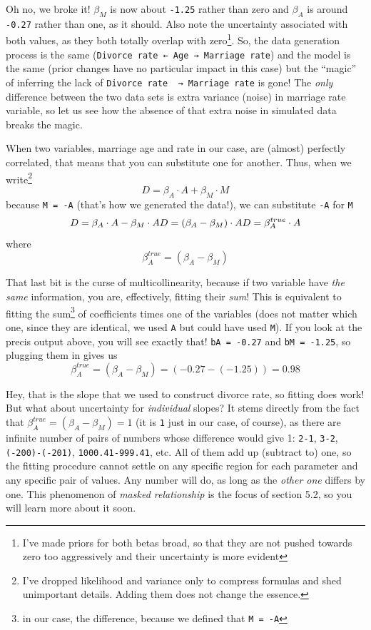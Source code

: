 \documentclass[
]{book}
\begin{document}
Oh no, we broke it! \(\beta_M\) is now about \texttt{-1.25} rather than zero and \(\beta_A\) is around \texttt{-0.27} rather than one, as it should. Also note the uncertainty associated with both values, as they both totally overlap with zero\footnote{I've made priors for both betas broad, so that they are not pushed towards zero too aggressively and their uncertainty is more evident}. So, the data generation process is the same (\texttt{Divorce\ rate\ ←\ Age\ →\ Marriage\ rate}) and the model is the same (prior changes have no particular impact in this case) but the ``magic'' of inferring the lack of \texttt{Divorce\ rate\ \ →\ Marriage\ rate} is gone! The \emph{only} difference between the two data sets is extra variance (noise) in marriage rate variable, so let us see how the absence of that extra noise in simulated data breaks the magic.

When two variables, marriage age and rate in our case, are (almost) perfectly correlated, that means that you can substitute one for another. Thus, when we write\footnote{I've dropped likelihood and variance only to compress formulas and shed unimportant details. Adding them does not change the essence.}
\[D = \beta_A \cdot A + \beta_M \cdot M\]
because \texttt{M\ =\ -A} (that's how we generated the data!), we can substitute \texttt{-A} for \texttt{M}
\[D = \beta_A \cdot A - \beta_M \cdot A \\
D = (\beta_A - \beta_M) \cdot A
D = \beta_A^{true} \cdot A
\]
where
\[ \beta_A^{true} = (\beta_A - \beta_M)
\]

That last bit is the curse of multicollinearity, because if two variable have \emph{the same} information, you are, effectively, fitting their \emph{sum}! This is equivalent to fitting the sum\footnote{in our case, the difference, because we defined that \texttt{M\ =\ -A}} of coefficients times one of the variables (does not matter which one, since they are identical, we used \texttt{A} but could have used \texttt{M}). If you look at the precis output above, you will see exactly that! \texttt{bA\ =\ -0.27} and \texttt{bM\ =\ -1.25}, so plugging them in gives us
\[ \beta_A^{true} = (\beta_A - \beta_M) = (-0.27 - (-1.25)) = 0.98\]

Hey, that is the slope that we used to construct divorce rate, so fitting does work! But what about uncertainty for \emph{individual} slopes? It stems directly from the fact that \(\beta_A^{true} = (\beta_A - \beta_M) = 1\) (it is \texttt{1} just in our case, of course), as there are infinite number of pairs of numbers whose difference would give 1: \texttt{2-1}, \texttt{3-2}, \texttt{(-200)-(-201)}, \texttt{1000.41-999.41}, etc. All of them add up (subtract to) one, so the fitting procedure cannot settle on any specific region for each parameter and any specific pair of values. Any number will do, as long as the \emph{other one} differs by one. This phenomenon of \emph{masked relationship} is the focus of section 5.2, so you will learn more about it soon.
\end{document}
